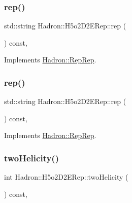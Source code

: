 \subsubsection{\texorpdfstring{rep()}{rep()}\hspace{0.1cm}{\footnotesize\ttfamily [2/3]}}
{\footnotesize\ttfamily std\+::string Hadron\+::\+H5o2\+D2\+E\+Rep\+::rep (\begin{DoxyParamCaption}{ }\end{DoxyParamCaption}) const\hspace{0.3cm}{\ttfamily [inline]}, {\ttfamily [virtual]}}



Implements \mbox{\hyperlink{structHadron_1_1RepRep_ab3213025f6de249f7095892109575fde}{Hadron\+::\+Rep\+Rep}}.

\mbox{\label{structHadron_1_1H5o2D2ERep_a114f378ebe8c306a6530f530da8ac8d1}} 
\subsubsection{\texorpdfstring{rep()}{rep()}\hspace{0.1cm}{\footnotesize\ttfamily [3/3]}}
{\footnotesize\ttfamily std\+::string Hadron\+::\+H5o2\+D2\+E\+Rep\+::rep (\begin{DoxyParamCaption}{ }\end{DoxyParamCaption}) const\hspace{0.3cm}{\ttfamily [inline]}, {\ttfamily [virtual]}}



Implements \mbox{\hyperlink{structHadron_1_1RepRep_ab3213025f6de249f7095892109575fde}{Hadron\+::\+Rep\+Rep}}.

\mbox{\label{structHadron_1_1H5o2D2ERep_a8a929124bb0b88a9f8c8c8a04e633baa}} 
\subsubsection{\texorpdfstring{twoHelicity()}{twoHelicity()}\hspace{0.1cm}{\footnotesize\ttfamily [1/2]}}
{\footnotesize\ttfamily int Hadron\+::\+H5o2\+D2\+E\+Rep\+::two\+Helicity (\begin{DoxyParamCaption}{ }\end{DoxyParamCaption}) const\hspace{0.3cm}{\ttfamily [inline]}, {\ttfamily [virtual]}}

